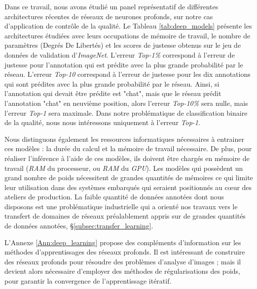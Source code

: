 Dans ce travail, nous avons étudié un panel représentatif de différentes architectures récentes de réseaux de neurones profonds, sur notre cas d'application de contrôle de la qualité.
Le Tableau \ref{tab:deep_models} présente les architectures étudiées avec leurs occupations de mémoire de travail, le nombre de paramètres (Degrés De Libertés) et les scores de justesse obtenus sur le jeu de données de validation d'\textit{ImageNet}.
L'erreur \textit{Top-1\%} correspond à l'erreur de justesse pour l'annotation qui est prédite avec la plus grande probabilité par le réseau.
L'erreur \textit{Top-10} correspond à l'erreur de justesse pour les dix annotations qui sont prédites avec la plus grande probabilité par le réseau.
Ainsi, si l'annotation qui devait être prédite est "chat", mais que le réseau prédit l'annotation "chat" en neuvième position, alors l'erreur \textit{Top-10\%} sera nulle, mais l'erreur \textit{Top-1} sera maximale.
Dans notre problématique de classification binaire de la qualité, nous nous intéressons uniquement à l'erreur \textit{Top-1}.

Nous distinguons également les ressources informatiques nécessaires à entrainer ces modèles : la durée du calcul et la mémoire de travail nécessaire.
De plus, pour réaliser l'inférence à l'aide de ces modèles, ils doivent être chargés en mémoire de travail (\textit{RAM} du processeur, ou \textit{RAM} du \textit{GPU}).
Les modèles qui possèdent un grand nombre de poids nécessitent de grandes quantités de mémoires ce qui limite leur utilisation dans des systèmes embarqués qui seraient positionnés au cœur des ateliers de production.
La faible quantité de données annotées dont nous disposons est une problématique industrielle qui a orienté nos travaux vers le transfert de domaines de réseaux préalablement appris sur de grandes quantités de données annotées, §\ref{subsec:transfer_learning}.

L'Annexe \ref{Ann:deep_learning} propose des compléments d'information sur les méthodes d'apprentissages des réseaux profonds.
Il est intéressant de construire des réseaux profonds pour résoudre des problèmes d'analyse d'images ; mais il devient alors nécessaire d'employer des méthodes de régularisations des poids, pour garantir la convergence de l'apprentissage itératif.

